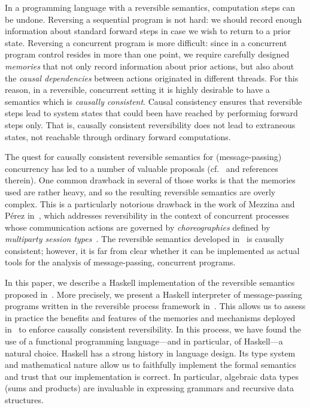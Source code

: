 \documentclass[runningheads]{llncs}
\begin{document}
In a programming language with a reversible semantics, computation steps can be undone.
Reversing a sequential program is not hard: we should record enough information about standard forward steps in case we wish to return to a prior state. Reversing a concurrent program is  more difficult: since in a concurrent program control resides in more than one point, we require carefully designed \emph{memories} that not only record information about prior actions, but also about the \emph{causal dependencies} between actions originated in different threads.
For this reason, in a reversible, concurrent setting it is highly desirable to have a semantics which is \emph{causally consistent}. Causal consistency ensures that reversible steps lead to system states that could been have reached by performing forward steps only. That is, causally consistent reversibility does not lead to extraneous states, not reachable through ordinary forward computations.

The quest for causally consistent reversible semantics for (message-passing) concurrency has led to a number of valuable proposals (cf.~\cite{DBLP:conf/ppdp/MezzinaP17} and references therein). One common drawback in several of those works is that the memories used are rather heavy, and so the resulting reversible semantics are overly complex. This is a particularly notorious drawback in the work of Mezzina and P\'{e}rez in~\cite{DBLP:conf/ppdp/MezzinaP17}, which addresses reversibility in the context of concurrent processes whose communication actions are governed by \emph{choreographies} defined by \emph{multiparty session types}~\cite{HYC08}. The reversible semantics developed in~\cite{DBLP:conf/ppdp/MezzinaP17} is causally consistent; however, it is far from clear whether it can be implemented as  actual tools for the  analysis of message-passing, concurrent programs.

In this paper, we describe a Haskell implementation of the reversible semantics proposed in~\cite{DBLP:conf/ppdp/MezzinaP17}. More precisely, we present a Haskell interpreter of message-passing programs written in the reversible process framework in~\cite{DBLP:conf/ppdp/MezzinaP17}. This allows us to assess in practice the benefits and features of the memories and mechanisms deployed in~\cite{DBLP:conf/ppdp/MezzinaP17} to enforce causally consistent reversibility. In this process, we have found the use of a functional programming language---and in particular, of Haskell---a natural choice. Haskell has a strong history in language design. Its type system and mathematical nature allow us to faithfully implement the formal semantics and trust that our implementation is correct. In particular, algebraic data types (sums and products) are invaluable in expressing grammars and recursive data structures. 
\end{document}
